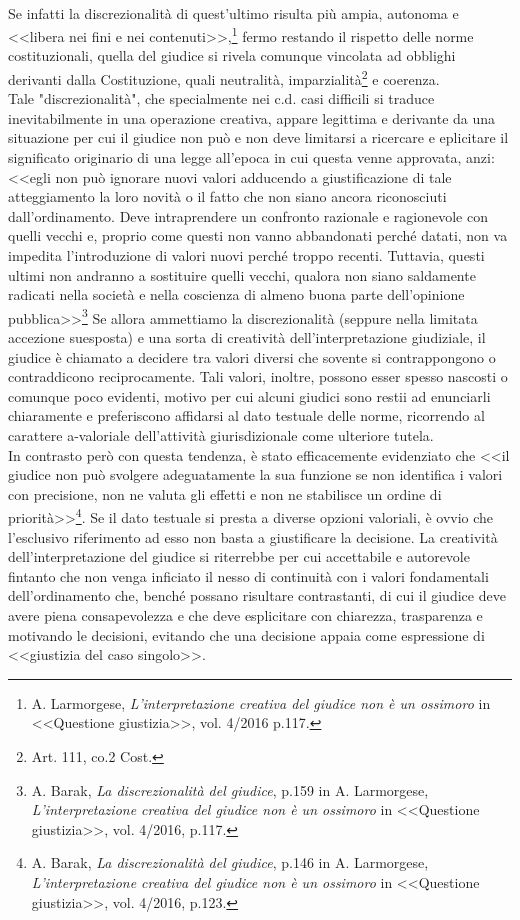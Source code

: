 \\Se infatti la discrezionalità di quest'ultimo risulta più ampia, autonoma e <<libera nei fini e nei contenuti>>,\footnote{A. Larmorgese, \textit{L’interpretazione creativa del giudice non è un ossimoro} in <<Questione giustizia>>, vol. 4/2016 p.117.} fermo restando il rispetto delle norme costituzionali, quella del giudice si rivela comunque vincolata ad obblighi derivanti dalla Costituzione, quali neutralità, imparzialità\footnote{Art. 111, co.2 Cost.} e coerenza.
\\Tale "discrezionalità", che specialmente nei c.d. casi difficili si traduce inevitabilmente in una operazione creativa, appare legittima e derivante da una situazione per cui il giudice non può e non deve limitarsi a ricercare e eplicitare il significato originario di una legge all'epoca in cui questa venne approvata, anzi: <<egli non può ignorare nuovi valori adducendo a giustificazione di tale atteggiamento la loro novità o il fatto che non siano ancora riconosciuti dall'ordinamento. Deve intraprendere un confronto razionale e ragionevole con quelli vecchi e, proprio come questi non vanno abbandonati perché datati, non va impedita l'introduzione di valori nuovi perché troppo recenti. Tuttavia, questi ultimi non andranno a sostituire quelli vecchi, qualora non siano saldamente radicati nella società e nella coscienza di almeno buona parte dell'opinione pubblica>>\footnote{A. Barak, \textit{La discrezionalità del giudice}, p.159 in A. Larmorgese, \textit{L’interpretazione creativa del giudice non è un ossimoro} in <<Questione giustizia>>, vol. 4/2016, p.117. }
Se allora ammettiamo la discrezionalità (seppure nella limitata accezione suesposta) e una sorta di creatività dell'interpretazione giudiziale, il giudice è chiamato a decidere tra valori diversi che sovente si contrappongono o contraddicono reciprocamente. 
Tali valori, inoltre, possono esser spesso nascosti o comunque poco evidenti, motivo per cui alcuni giudici sono restii ad enunciarli chiaramente e preferiscono affidarsi al dato testuale delle norme, ricorrendo al carattere a-valoriale dell'attività giurisdizionale come ulteriore tutela. 
\\In contrasto però con questa tendenza, è stato efficacemente evidenziato che <<il giudice non può svolgere adeguatamente la sua funzione se non identifica i valori con precisione, non ne valuta gli effetti e non ne stabilisce un ordine di priorità>>\footnote{A. Barak, \textit{La discrezionalità del giudice}, p.146 in A. Larmorgese, \textit{L’interpretazione creativa del giudice non è un ossimoro} in <<Questione giustizia>>, vol. 4/2016, p.123. }.
Se il dato testuale si presta a diverse opzioni valoriali, è ovvio che l'esclusivo riferimento ad esso non basta a giustificare la decisione. 
La creatività dell’interpretazione del giudice si riterrebbe per cui accettabile e autorevole fintanto che non venga inficiato il nesso di continuità con i valori fondamentali dell’ordinamento che, benché possano risultare contrastanti, di cui il giudice deve avere piena consapevolezza e che deve esplicitare con chiarezza, trasparenza e motivando le decisioni, evitando che una decisione appaia come espressione di <<giustizia del caso singolo>>.

